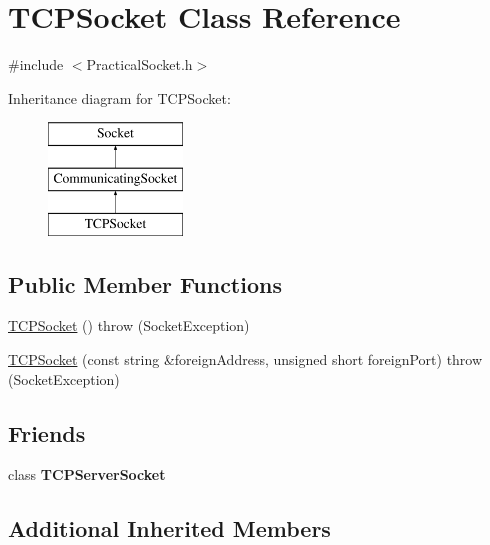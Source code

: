 \hypertarget{classTCPSocket}{\section{T\-C\-P\-Socket Class Reference}
\label{classTCPSocket}
}


{\ttfamily \#include $<$Practical\-Socket.\-h$>$}

Inheritance diagram for T\-C\-P\-Socket\-:\begin{figure}[H]
\begin{center}
\leavevmode
\includegraphics[height=3.000000cm]{classTCPSocket}
\end{center}
\end{figure}
\subsection*{Public Member Functions}
\begin{DoxyCompactItemize}
\item 
\hyperlink{classTCPSocket_a7a50427a401d1a6f3209d51818bad901}{T\-C\-P\-Socket} ()  throw (\-Socket\-Exception)
\item 
\hyperlink{classTCPSocket_a7b246b66f6dc3246ab2777b771e5f917}{T\-C\-P\-Socket} (const string \&foreign\-Address, unsigned short foreign\-Port)  throw (\-Socket\-Exception)
\end{DoxyCompactItemize}
\subsection*{Friends}
\begin{DoxyCompactItemize}
\item 
\hypertarget{classTCPSocket_ae8bcdc0d25881a17b23e557296236fa9}{class {\bfseries T\-C\-P\-Server\-Socket}}\label{classTCPSocket_ae8bcdc0d25881a17b23e557296236fa9}

\end{DoxyCompactItemize}
\subsection*{Additional Inherited Members}


